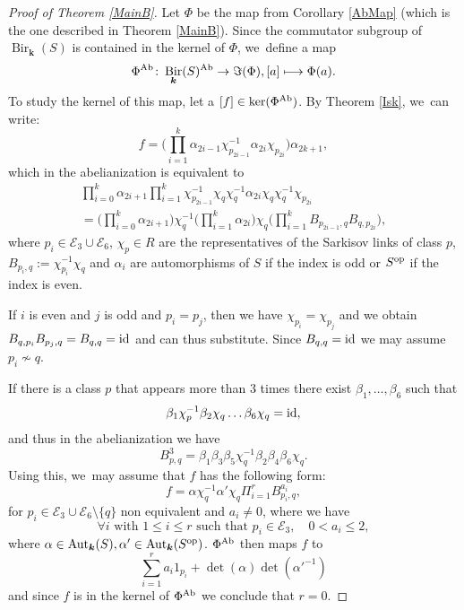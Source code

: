 \documentclass[JEP,XML,SOM,Unicode,NoFloatCountersInSection, NoEqCountersInSection,published]{cedram}
\newcommand\mto{\mathchoice{\longmapsto}{\mapsto}{\mapsto}{\mapsto}}
\newcommand{\Ab}{\textup{Ab}}
\newcommand{\id}{\textup{id}}
\newcommand{\op}{\textup{op}}
\theoremstyle{definition}
\newcommand{\kk}{{\boldsymbol{k}}}
\DeclareMathOperator{\Bir}{Bir}
\DeclareMathOperator{\Aut}{Aut}
\begin{document}
\begin{proof}[Proof of Theorem \ref{MainB}]
Let $\Phi$ be the map from Corollary \ref{AbMap} (which is the one described in Theorem \ref{MainB}). Since the commutator subgroup of $\Bir_{\kk}(S)$ is contained in the kernel of $\Phi$, we~define a map
\[
\Phi^{\Ab} \colon \Bir_{\kk}(S)^{\Ab} \to \Im(\Phi), [a] \mto \Phi(a).
\]
To study the kernel of this map, let a $[f] \in \ker(\Phi^{\Ab})$. By Theorem \ref{Isk}, we~can write:
\[
f = \biggl(\prod_{i=1}^k \alpha_{2i - 1} \chi_{p_{2i-1}}^{-1} \alpha_{2i} \chi_{p_{2i}}\biggr) \alpha_{2k + 1},
\]
which in the abelianization is equivalent to\vspace*{-3pt}
\begin{multline*}
\prod_{i=0}^k \alpha_{2i+1} \prod_{i=1}^k \chi_{p_{2i -1}}^{-1} \chi_q \chi_q^{-1} \alpha_{2i} \chi_q \chi_q^{-1} \chi_{p_{2i}}
\\[-5pt]
= \biggl(\prod_{i=0}^k \alpha_{2i+1}\biggr) \chi_q^{-1} \biggl(\prod_{i=1}^k \alpha_{2i}\biggr) \chi_q \biggl(\prod_{i=1}^k B_{p_{2i -1},q}B_{q,p_{2i}}\biggr),
\end{multline*}
where $p_i \in \mathcal{E}_3 \cup \mathcal{E}_6$, $\chi_p \in R$ are the representatives of the Sarkisov links of class $p$, $B_{p_i,q} := \chi_{p_i}^{-1}\chi_q$ and $\alpha_i$ are automorphisms of $S$ if the index is odd or $S^{\op}$ if the index is even.

If $i$ is even and $j$ is odd and $p_i = p_j$, then we have $\chi_{p_i} = \chi_{p_j}$ and we obtain $B_{q,p_i} B_{p_j,q} = B_{q,q} = \id$ and can thus substitute. Since $B_{q,q} = \id$ we may assume $p_i \not\sim q$.

If there is a class $p$ that appears more than 3 times there exist $\beta_1, \dots , \beta_6$ such that
\[
\beta_1 \chi_p^{-1} \beta_2\chi_q \dots \beta_6 \chi_q = \id,
\]
and thus in the abelianization we have
\[
B_{p,q}^3 = \beta_1 \beta_3 \beta_5 \chi_q^{-1} \beta_2 \beta_4 \beta_6 \chi_q.
\]
Using this, we~may assume that $f$ has the following form:
\begin{equation*}
f = \alpha \chi_q^{-1} \alpha' \chi_q \Pi_{i=1}^r B_{p_i,q}^{a_i},
\end{equation*}
for $p_i \in \mathcal{E}_3 \cup \mathcal{E}_6 \setminus \{ q \}$ non equivalent and $a_i \neq 0$, where we have
\begin{equation*}
\forall  i\text{ with } 1 \leq i \leq r \text{ such that } p_i \in \mathcal{E}_3, \quad 0 < a_i \leq 2,
\end{equation*}
where $\alpha \in \Aut_{\kk}(S), \alpha' \in \Aut_{\kk}(S^{\op})$. $\Phi^{\Ab}$ then maps $f$ to
\[
\sum_{i=1}^r a_i 1_{p_i} + \det(\alpha) \det(\alpha'^{-1})
\]
and since $f$ is in the kernel of $\Phi^{\Ab}$ we conclude that $r = 0$.


\end{proof}
\end{document}
